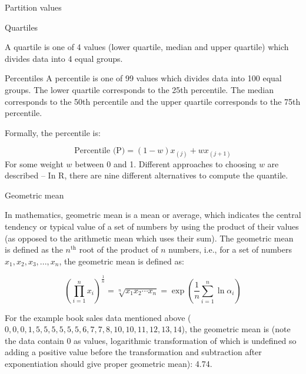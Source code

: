 \documentclass[
  ignorenonframetext,
  aspectratio=169]{beamer}
\begin{document}
\begin{frame}{Partition values}
\protect\hypertarget{partition-values}{}
\begin{block}{Quartiles}

\small
A quartile is one of 4 values (lower quartile, median and upper quartile) which divides data into 4 equal groups.
\end{block}

\begin{block}{Percentiles}
\small
A percentile is one of 99 values which divides data into 100 equal groups. The lower quartile corresponds to the 25th percentile. The median corresponds to the 50th percentile and the upper quartile corresponds to the 75th percentile.

Formally, the percentile is:

$$
\text{Percentile (P)} = (1 - w)x_{(j)} + wx_{(j+1)}
$$
For some weight $w$ between 0 and 1. Different approaches to choosing $w$ are described -- In R, there are nine different alternatives to compute the quantile. 

\end{block}
\end{frame}

\begin{frame}{Geometric mean}
\protect\hypertarget{geometric-mean}{}
\small

In mathematics, geometric mean is a mean or average, which indicates the
central tendency or typical value of a set of numbers by using the
product of their values (as opposed to the arithmetic mean which uses
their sum). The geometric mean is defined as the \(n^{\text{th}}\) root
of the product of \(n\) numbers, i.e., for a set of numbers
\(x_1, x_2, x_3, ..., x_n\), the geometric mean is defined as:

\[
\left(\prod _{i=1}^{n}x_{i}\right)^{\frac {1}{n}}={\sqrt[{n}]{x_{1}x_{2}\cdots x_{n}}} = \exp\left(\frac{1}{n} \sum_{i = 1}^n \ln \alpha_i \right)
\]

For the example book sales data mentioned above (
\(0, 0, 0, 1, 5, 5, 5, 5, 5, 5, 6 , 7, 7, 8, 10, 10, 11, 12, 13, 14\)),
the geometric mean is (note the data contain 0 as values, logarithmic
transformation of which is undefined so adding a positive value before
the transformation and subtraction after exponentiation should give
proper geometric mean): 4.74.
\end{frame}
\end{document}
